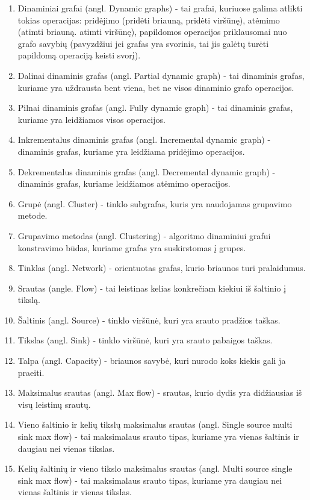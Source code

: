 \begin{enumerate}
	\item Dinaminiai grafai (angl. Dynamic graphs) - tai grafai, kuriuose galima atlikti tokias operacijas: pridėjimo (pridėti briauną, pridėti viršūnę), atėmimo (atimti briauną. atimti viršūnę), papildomos operacijos priklausomai nuo grafo savybių (pavyzdžiui jei grafas yra svorinis, tai jis galėtų turėti papildomą operaciją keisti svorį).
	\item Dalinai dinaminis grafas (angl. Partial dynamic graph) - tai dinaminis grafas, kuriame yra uždrausta bent viena, bet ne visos dinaminio grafo operacijos.
	\item Pilnai dinaminis grafas (angl. Fully dynamic graph) - tai dinaminis grafas, kuriame yra leidžiamos visos operacijos.
	\item Inkrementalus dinaminis grafas (angl. Incremental dynamic graph) - dinaminis grafas, kuriame yra leidžiama pridėjimo operacijos.
	\item Dekrementalus dinaminis grafas (angl. Decremental dynamic graph) - dinaminis grafas, kuriame leidžiamos atėmimo operacijos.
	\item Grupė (angl. Cluster) - tinklo subgrafas, kuris yra naudojamas grupavimo metode.
	\item Grupavimo metodas (angl. Clustering) - algoritmo dinaminiui grafui konstravimo būdas, kuriame grafas yra suskirstomas į grupes.
	\item Tinklas (angl. Network) - orientuotas grafas, kurio briaunos turi pralaidumus.
	\item Srautas (angle. Flow) - tai leistinas kelias konkrečiam kiekiui iš šaltinio į tikslą.
	\item Šaltinis (angl. Source) - tinklo viršūnė, kuri yra srauto pradžios taškas.
	\item Tikslas (angl. Sink) - tinklo viršūnė, kuri yra srauto pabaigos taškas.
	\item Talpa (angl. Capacity) - briaunos savybė, kuri nurodo koks kiekis gali ja praeiti.
	\item  Maksimalus srautas (angl. Max flow) - srautas, kurio dydis yra didžiausias iš visų leistinų srautų.
	\item Vieno šaltinio ir kelių tikslų maksimalus srautas (angl. Single source multi sink max flow) - tai maksimalaus srauto tipas, kuriame yra vienas šaltinis ir daugiau nei vienas tikslas.
	\item Kelių šaltinių ir vieno tikslo maksimalus srautas (angl. Multi source single sink max flow) - tai maksimalaus srauto tipas, kuriame yra daugiau nei vienas šaltinis ir vienas tikslas.

\end{enumerate}
